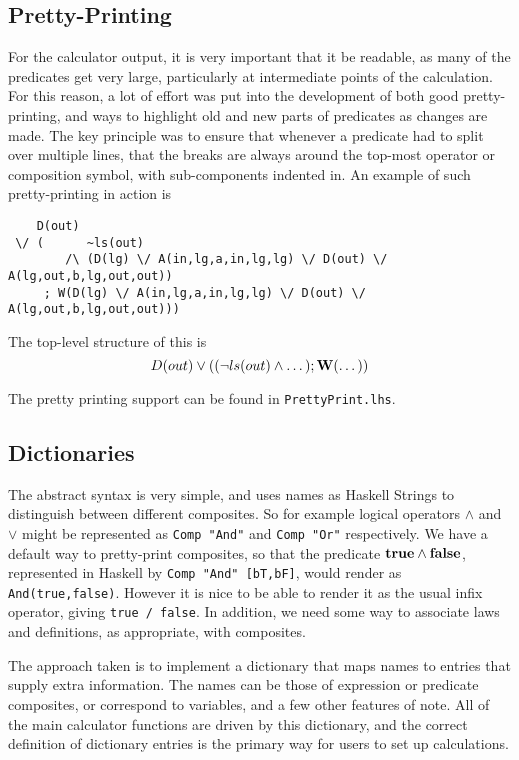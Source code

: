 \subsection{Pretty-Printing}\label{ssec:pp}

For the calculator output,
it is very important that it be readable,
as many of the predicates get very large,
particularly at intermediate points of the calculation.
For this reason, a lot of effort was put into the development
of both good pretty-printing,
and ways to highlight old and new parts of predicates as changes are made.
The key principle was to ensure that whenever a predicate
had to split over multiple lines,
that the breaks are always around the top-most operator or composition
symbol, with sub-components indented in.
An example of such pretty-printing in action is

{\small
\begin{verbatim}
    D(out)
 \/ (      ~ls(out)
        /\ (D(lg) \/ A(in,lg,a,in,lg,lg) \/ D(out) \/ A(lg,out,b,lg,out,out))
     ; W(D(lg) \/ A(in,lg,a,in,lg,lg) \/ D(out) \/ A(lg,out,b,lg,out,out)))
\end{verbatim}
}
The top-level structure of this is
\[D(out) \lor ( (\lnot ls(out) \land \dots) ; \mathbf{W}(\dots) )\]

The pretty printing support can be found in \texttt{PrettyPrint.lhs}.

\subsection{Dictionaries}\label{ssec:dict}

The abstract syntax is very simple,
and uses names as Haskell Strings to distinguish between
different composites.
So for example logical operators $\land$ and $\lor$
might be represented as \texttt{Comp "And"} and \texttt{Comp "Or"}
respectively.
We have a default way to pretty-print composites,
so that the predicate $\mathbf{true} \land \mathbf{false}$,
represented in Haskell by \texttt{Comp "And" [bT,bF]},
would render as \texttt{And(true,false)}.
However it is nice to be able to render it as the usual
infix operator, giving \texttt{true /\BS\ false}.
In addition, we need some way to associate laws and definitions,
as appropriate, with composites.

The approach taken is to implement a dictionary that maps names
to entries that supply extra information.
The names can be those of expression or predicate composites,
or correspond to variables, and a few other features of note.
All of the main calculator functions are driven by this
dictionary,
and the correct definition of dictionary entries
is the primary way for users to set up calculations.

